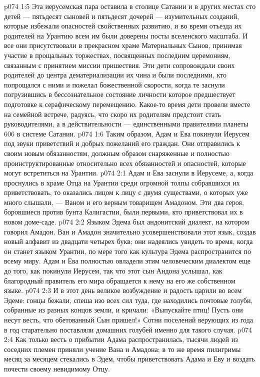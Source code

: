 \vs p074 1:5 \pc Эта иерусемская пара оставила в столице Сатании и в других местах сто детей --- пятьдесят сыновей и пятьдесят дочерей --- изумительных созданий, которые избежали опасностей свойственных развитию, и во время отъезда их родителей на Урантию всем им были доверены посты вселенского масштаба. И все они присутствовали в прекрасном храме Материальных Сынов, принимая участие в прощальных торжествах, посвященных последним церемониям, связанным с принятием миссии пришествия. Эти дети сопровождали своих родителей до центра дематериализации их чина и были последними, кто попрощался с ними и пожелал божественной скорости, когда те заснули погрузившись в бессознательное состояние личности которое предшествует подготовке к серафическому перемещению. Какое\hyp{}то время дети провели вместе на семейной встрече, радуясь, что скоро их родителям предстоит стать руководителями, а в действительности --- единственными правителями планеты 606 в системе Сатании.
\vs p074 1:6 Таким образом, Адам и Ева покинули Иерусем под звуки приветствий и добрых пожеланий его граждан. Они отправились к своим новым обязанностям, должным образом снаряженные и полностью проинструктированные относительно всех обязанностей и опасностей, которые могут встретиться на Урантии.
\vs p074 2:1 Адам и Ева заснули в Иерусеме, а, когда проснулись в храме Отца на Урантии среди огромной толпы собравшихся их приветствовать, то оказались лицом к лицу с двумя существами, о которых уже много слышали, --- Ваном и его верным товарищем Амадоном. Эти два героя, боровшиеся против бунта Калигастии, были первыми, кто приветствовал их в новом доме\hyp{}саде.
\vs p074 2:2 Языком Эдема был андонитский диалект, на котором говорил Амадон. Ван и Амадон значительно усовершенствовали этот язык, создав новый алфавит из двадцати четырех букв; они надеялись увидеть то время, когда он станет языком Урантии, по мере того как культура Эдема распространится по всему миру. Адам и Ева полностью овладели этим человеческим диалектом еще до того, как покинули Иерусем, так что этот сын Андона услышал, как благородный правитель его мира обращается к нему на его же собственном языке.
\vs p074 2:3 И в этот день великое возбуждение и радость царили во всем Эдеме: гонцы бежали, спеша изо всех сил туда, где находились почтовые голуби, собранные из разных концов земли, и кричали: «Выпускайте птиц! Пусть они несут весть, что обетованный Сын пришел!» Сотни поселений верующих из года в год старательно поставляли домашних голубей именно для такого случая.
\vs p074 2:4 \pc Как только весть о прибытии Адама распространилась, тысячи людей из соседних племен приняли учение Вана и Амадона; в то же время пилигримы месяц за месяцем стекались в Эдем, чтобы приветствовать Адама и Еву и воздать почести своему невидимому Отцу.
